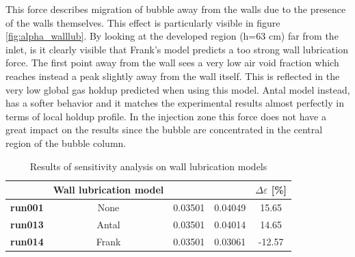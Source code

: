\documentclass[11pt,a4paper]{article}
\newcommand{\thead}[2][.95in]{%
  \vbox{\hsize#1\baselineskip11pt\centering\vspace*{3pt}#2\par}}
\begin{document}
This force describes migration of bubble away from the walls due to the presence of the walls themselves. This effect is particularly visible in figure \ref{fig:alpha_walllub}. By looking at the developed region (h=63 cm) far from the inlet, is it clearly visible that Frank's model predicts a too strong wall lubrication force. The first point away from the wall sees a very low air void fraction which reaches instead a peak slightly away from the wall itself. This is reflected in the very low global gas holdup predicted when using this model. Antal model instead, has a softer behavior and it matches the experimental results almost perfectly in terms of local holdup profile. In the injection zone this force does not have a great impact on the results since the bubble are concentrated in the central region of the bubble column.


\begin{table}[H]
    \centering 
    \begin{tabular}{|p{8em} c c c c|}
    \hline
    \rowcolor{bluePoli!40}
    & \textbf{Wall lubrication model} & \thead{Experimental holdup [-]} & \thead{Numerical holdup [-]} & $\Delta \varepsilon$ [\%] \T\B \\
    \hline \hline
    \textbf{run001} & None & 0.03501 &  0.04049 & 15.65\T\B \\
    \textbf{run013} & Antal  & 0.03501 & 0.04014 & 14.65\T\B \\
    \textbf{run014} & Frank & 0.03501 & 0.03061 & -12.57\T\B \\
    \hline
    \end{tabular}    \\[10pt]
    \caption{Results of sensitivity analysis on wall lubrication models}
    \label{table:wall_lubrication_models}
\end{table}
\end{document}
